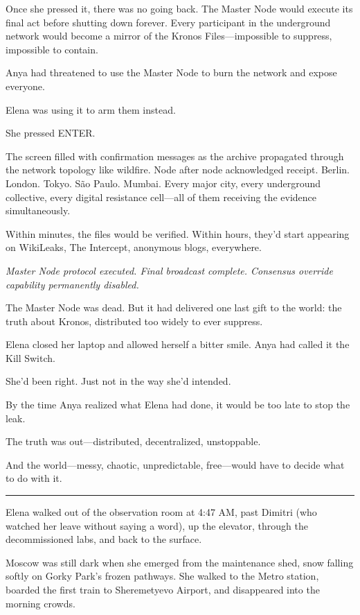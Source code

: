 \documentclass[12pt,letterpaper]{book}
\begin{document}
Once she pressed it, there was no going back. The Master Node would execute its final act before shutting down forever. Every participant in the underground network would become a mirror of the Kronos Files---impossible to suppress, impossible to contain.

Anya had threatened to use the Master Node to burn the network and expose everyone.

Elena was using it to arm them instead.

She pressed ENTER.

The screen filled with confirmation messages as the archive propagated through the network topology like wildfire. Node after node acknowledged receipt. Berlin. London. Tokyo. São Paulo. Mumbai. Every major city, every underground collective, every digital resistance cell---all of them receiving the evidence simultaneously.

Within minutes, the files would be verified. Within hours, they'd start appearing on WikiLeaks, The Intercept, anonymous blogs, everywhere.

\emph{Master Node protocol executed. Final broadcast complete. Consensus override capability permanently disabled.}

The Master Node was dead. But it had delivered one last gift to the world: the truth about Kronos, distributed too widely to ever suppress.

Elena closed her laptop and allowed herself a bitter smile. Anya had called it the Kill Switch.

She'd been right. Just not in the way she'd intended.

By the time Anya realized what Elena had done, it would be too late to stop the leak.

The truth was out---distributed, decentralized, unstoppable.

And the world---messy, chaotic, unpredictable, free---would have to decide what to do with it.

\begin{center}\rule{0.5\linewidth}{0.5pt}\end{center}

Elena walked out of the observation room at 4:47 AM, past Dimitri (who watched her leave without saying a word), up the elevator, through the decommissioned labs, and back to the surface.

Moscow was still dark when she emerged from the maintenance shed, snow falling softly on Gorky Park's frozen pathways. She walked to the Metro station, boarded the first train to Sheremetyevo Airport, and disappeared into the morning crowds.
\end{document}
